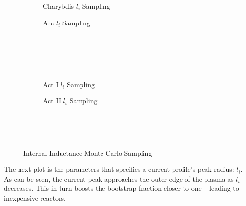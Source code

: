 \begin{figure*}
    \centering
    \hfill 
    \begin{subfigure}[t]{0.45\textwidth}
        \centering
		\begin{adjustbox}{width=\textwidth}
			\Large
			
		\end{adjustbox}
        \caption{Charybdis $l_i$ Sampling}
    \end{subfigure}
    \hfill
    \begin{subfigure}[t]{0.45\textwidth}
        \centering
		\begin{adjustbox}{width=\textwidth}
			\Large
			
		\end{adjustbox}
        \caption{Arc $l_i$ Sampling}
    \end{subfigure}
    \hfill \hfill ~\\ ~\\ ~\\ ~\\
    \hfill 
    \begin{subfigure}[t]{0.45\textwidth}
        \centering
		\begin{adjustbox}{width=\textwidth}
			\Large
			
		\end{adjustbox}
        \caption{Act I $l_i$ Sampling}
    \end{subfigure}
    \hfill
    \begin{subfigure}[t]{0.45\textwidth}
        \centering
		\begin{adjustbox}{width=\textwidth}
			\Large
			
		\end{adjustbox}
        \caption{Act II $l_i$ Sampling}
    \end{subfigure}	
    \hfill \hfill ~\\ ~\\ ~\\
    \caption{Internal Inductance Monte Carlo Sampling}
    \label{fig:inductance_samplings}
\end{figure*}

The next plot is the parameters that specifies a current profile's peak radius: $l_i$. As can be seen, the current peak approaches the outer edge of the plasma as $l_i$ decreases. This in turn boosts the bootstrap fraction closer to one -- leading to inexpensive reactors.

